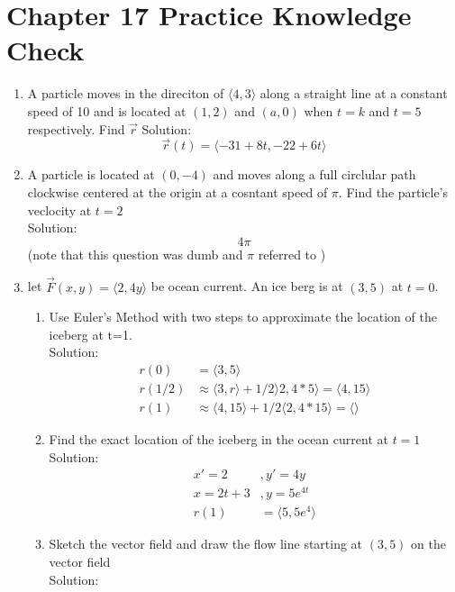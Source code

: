 \documentclass[11pt]{article}
\begin{document}
\section{Chapter 17 Practice Knowledge Check}
\begin{enumerate}
  \item A particle moves in the direciton of $\langle 4,3 \rangle $ along a straight line at a constant speed of 10 and is located at $(1,2)$ and $(a, 0)$ when $t=k$
        and $t=5$ respectively. Find $\vec{r}$
        Solution: \[\vec{r}(t) = \langle -31 + 8t, -22 + 6t \rangle\]
  \item A particle is located at $(0, -4)$ and moves along a full circlular path clockwise centered at the origin at a cosntant
        speed of $\pi$. Find the particle's veclocity at $t=2$\\
        Solution: \[4\pi\]
        (note that this question was dumb and $\pi$ referred to )
  \item let $\vec{F}(x,y) = \langle 2, 4y \rangle$ be ocean current. An ice berg is at $(3,5)$ at $t=0$.
        \begin{enumerate}
          \item Use Euler's Method with two steps to approximate the location of the iceberg at t=1. \\
                Solution:
                \begin{align*}
                    r(0) &= \langle 3, 5\rangle \\
                  r(1/2) &\approx \langle 3, r \rangle + 1/2 \rangle 2, 4 * 5 \rangle = \langle 4, 15 \rangle \\
                  r(1) &\approx \langle 4, 15 \rangle + 1/2 \langle 2, 4*15 \rangle = \langle \rangle
                  \end{align*}
          \item Find the exact location of the iceberg in the ocean current at $t=1$\\
                Solution:
                \begin{align*}
                  x' = 2&, y' = 4y \\
                  x = 2t + 3&, y = 5e^{4t} \\
                  r(1) &= \langle 5, 5e^{4} \rangle
                \end{align*}
          \item Sketch the vector field and draw the flow line starting at $(3,5)$ on the vector field \\
                Solution:
        \end{enumerate}
\end{enumerate}
\end{document}

